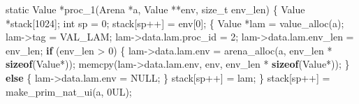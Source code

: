 \documentclass[]{article}
\newenvironment{Shaded}{}{}
\newcommand{\BuiltInTok}[1]{\textcolor[rgb]{0.00,0.50,0.00}{#1}}
\newcommand{\ControlFlowTok}[1]{\textcolor[rgb]{0.00,0.44,0.13}{\textbf{#1}}}
\newcommand{\DataTypeTok}[1]{\textcolor[rgb]{0.56,0.13,0.00}{#1}}
\newcommand{\DecValTok}[1]{\textcolor[rgb]{0.25,0.63,0.44}{#1}}
\newcommand{\KeywordTok}[1]{\textcolor[rgb]{0.00,0.44,0.13}{\textbf{#1}}}
\newcommand{\NormalTok}[1]{#1}
\newcommand{\OperatorTok}[1]{\textcolor[rgb]{0.40,0.40,0.40}{#1}}
\begin{document}
\begin{Shaded}
\begin{Highlighting}[]
\DataTypeTok{static}\NormalTok{ Value }\OperatorTok{*}\NormalTok{proc\_1}\OperatorTok{(}\NormalTok{Arena }\OperatorTok{*}\NormalTok{a}\OperatorTok{,}\NormalTok{ Value }\OperatorTok{**}\NormalTok{env}\OperatorTok{,} \DataTypeTok{size\_t}\NormalTok{ env\_len}\OperatorTok{)} \OperatorTok{\{}
\NormalTok{    Value }\OperatorTok{*}\NormalTok{stack}\OperatorTok{[}\DecValTok{1024}\OperatorTok{];}
    \DataTypeTok{int}\NormalTok{ sp }\OperatorTok{=} \DecValTok{0}\OperatorTok{;}
\NormalTok{    stack}\OperatorTok{[}\NormalTok{sp}\OperatorTok{++]} \OperatorTok{=}\NormalTok{ env}\OperatorTok{[}\DecValTok{0}\OperatorTok{];}
    \OperatorTok{\{}
\NormalTok{        Value }\OperatorTok{*}\NormalTok{lam }\OperatorTok{=}\NormalTok{ value\_alloc}\OperatorTok{(}\NormalTok{a}\OperatorTok{);}
\NormalTok{        lam}\OperatorTok{{-}\textgreater{}}\NormalTok{tag }\OperatorTok{=}\NormalTok{ VAL\_LAM}\OperatorTok{;}
\NormalTok{        lam}\OperatorTok{{-}\textgreater{}}\NormalTok{data}\OperatorTok{.}\NormalTok{lam}\OperatorTok{.}\NormalTok{proc\_id }\OperatorTok{=} \DecValTok{2}\OperatorTok{;}
\NormalTok{        lam}\OperatorTok{{-}\textgreater{}}\NormalTok{data}\OperatorTok{.}\NormalTok{lam}\OperatorTok{.}\NormalTok{env\_len }\OperatorTok{=}\NormalTok{ env\_len}\OperatorTok{;}
        \ControlFlowTok{if} \OperatorTok{(}\NormalTok{env\_len }\OperatorTok{\textgreater{}} \DecValTok{0}\OperatorTok{)} \OperatorTok{\{}
\NormalTok{            lam}\OperatorTok{{-}\textgreater{}}\NormalTok{data}\OperatorTok{.}\NormalTok{lam}\OperatorTok{.}\NormalTok{env }\OperatorTok{=}\NormalTok{ arena\_alloc}\OperatorTok{(}\NormalTok{a}\OperatorTok{,}\NormalTok{ env\_len }\OperatorTok{*} \KeywordTok{sizeof}\OperatorTok{(}\NormalTok{Value}\OperatorTok{*));}
\NormalTok{            memcpy}\OperatorTok{(}\NormalTok{lam}\OperatorTok{{-}\textgreater{}}\NormalTok{data}\OperatorTok{.}\NormalTok{lam}\OperatorTok{.}\NormalTok{env}\OperatorTok{,}\NormalTok{ env}\OperatorTok{,}\NormalTok{ env\_len }\OperatorTok{*} \KeywordTok{sizeof}\OperatorTok{(}\NormalTok{Value}\OperatorTok{*));}
        \OperatorTok{\}} \ControlFlowTok{else} \OperatorTok{\{}
\NormalTok{            lam}\OperatorTok{{-}\textgreater{}}\NormalTok{data}\OperatorTok{.}\NormalTok{lam}\OperatorTok{.}\NormalTok{env }\OperatorTok{=}\NormalTok{ NULL}\OperatorTok{;}
        \OperatorTok{\}}
\NormalTok{        stack}\OperatorTok{[}\NormalTok{sp}\OperatorTok{++]} \OperatorTok{=}\NormalTok{ lam}\OperatorTok{;}
    \OperatorTok{\}}
\NormalTok{    stack}\OperatorTok{[}\NormalTok{sp}\OperatorTok{++]} \OperatorTok{=}\NormalTok{ make\_prim\_nat\_ui}\OperatorTok{(}\NormalTok{a}\OperatorTok{,} \DecValTok{0}\BuiltInTok{UL}\OperatorTok{);}

\end{Highlighting}
\end{Shaded}
\end{document}
